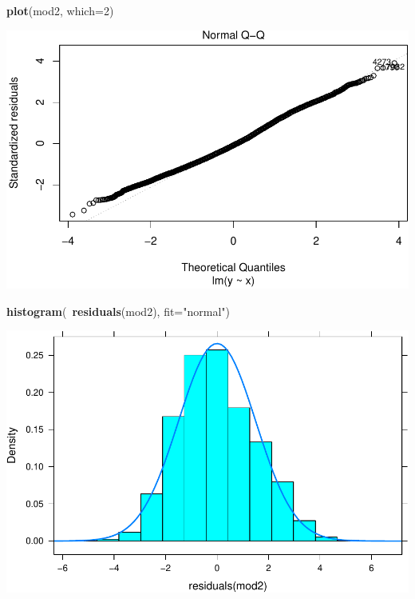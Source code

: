 \documentclass[]{article}
\newenvironment{Shaded}{\begin{snugshade}}{\end{snugshade}}
\newcommand{\KeywordTok}[1]{\textcolor[rgb]{0.13,0.29,0.53}{\textbf{{#1}}}}
\newcommand{\DataTypeTok}[1]{\textcolor[rgb]{0.13,0.29,0.53}{{#1}}}
\newcommand{\DecValTok}[1]{\textcolor[rgb]{0.00,0.00,0.81}{{#1}}}
\newcommand{\StringTok}[1]{\textcolor[rgb]{0.31,0.60,0.02}{{#1}}}
\newcommand{\NormalTok}[1]{{#1}}
\begin{document}
\begin{Shaded}
\begin{Highlighting}[]
\KeywordTok{plot}\NormalTok{(mod2, }\DataTypeTok{which=}\DecValTok{2}\NormalTok{)}
\end{Highlighting}
\end{Shaded}

\includegraphics{02_lab_residuals_files/figure-latex/unnamed-chunk-13-3.pdf}

\begin{Shaded}
\begin{Highlighting}[]
\KeywordTok{histogram}\NormalTok{(~}\KeywordTok{residuals}\NormalTok{(mod2), }\DataTypeTok{fit=}\StringTok{"normal"}\NormalTok{)}
\end{Highlighting}
\end{Shaded}

\includegraphics{02_lab_residuals_files/figure-latex/unnamed-chunk-13-4.pdf}
\end{document}
